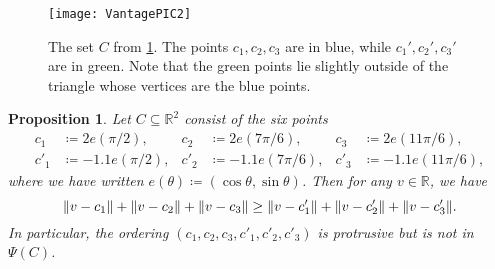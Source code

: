 \documentclass[11pt]{amsart}
\newtheorem{proposition}[theorem]{Proposition}
\theoremstyle{definition}
\DeclarePairedDelimiter{\Abs}{\lVert}{\rVert}
\newcommand{\RR}{\mathbb{R}}
\begin{document}
\begin{figure}[tbp]
\begin{center}{\texttt{[image: VantagePIC2]}}
\end{center}
\caption{The set $C$ from \cref{prop:6-points}. The points $c_1,c_2,c_3$ are in blue, while $c_1',c_2',c_3'$ are in green. Note that the green points lie slightly outside of the triangle whose vertices are the blue points. }
\label{fig:6points}
\end{figure}

\begin{proposition}\label{prop:6-points}
Let $C \subseteq \RR^2$ consist of the six points
\begin{align*}
c_1&\coloneqq2e(\pi/2), &c_2&\coloneqq2e(7\pi/6),&c_3&\coloneqq2e(11\pi/6),\\
c'_1&\coloneqq-1.1e(\pi/2), &c'_2&\coloneqq-1.1e(7\pi/6), &c'_3&\coloneqq-1.1e(11\pi/6),
\end{align*}
where we have written $e(\theta)\coloneqq(\cos \theta, \sin \theta)$.
Then for any $v \in \RR$, we have
\[\Abs{v-c_1}+\Abs{v-c_2}+\Abs{v-c_3} \geq \Abs{v-c'_1}+\Abs{v-c'_2}+\Abs{v-c'_3}.\]
In particular, the ordering $(c_1, c_2, c_3, c'_1, c'_2, c'_3)$ is protrusive but is not in $\Psi(C)$.
\end{proposition}
\end{document}
